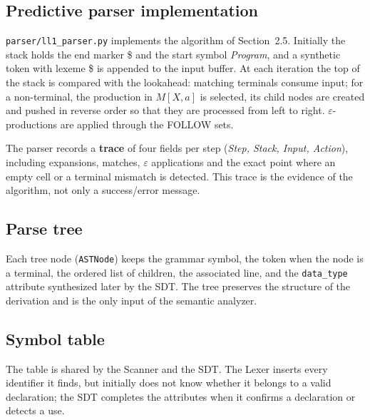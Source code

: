 \documentclass[11pt,a4paper]{article}
\newcommand{\eps}{\varepsilon}
\newcommand{\nt}[1]{\textit{#1}}
\begin{document}
\subsection{Predictive parser implementation}
\texttt{parser/ll1\_parser.py} implements the algorithm of Section~2.5. Initially the stack holds the end marker \$ and the start symbol \nt{Program}, and a synthetic token with lexeme \$ is appended to the input buffer. At each iteration the top of the stack is compared with the lookahead: matching terminals consume input; for a non-terminal, the production in $M[X,a]$ is selected, its child nodes are created and pushed in reverse order so that they are processed from left to right. $\eps$-productions are applied through the FOLLOW sets.

The parser records a \textbf{trace} of four fields per step (\emph{Step, Stack, Input, Action}), including expansions, matches, $\eps$ applications and the exact point where an empty cell or a terminal mismatch is detected. This trace is the evidence of the algorithm, not only a success/error message.

\subsection{Parse tree}
Each tree node (\texttt{ASTNode}) keeps the grammar symbol, the token when the node is a terminal, the ordered list of children, the associated line, and the \texttt{data\_type} attribute synthesized later by the SDT. The tree preserves the structure of the derivation and is the only input of the semantic analyzer.

\subsection{Symbol table}
The table is shared by the Scanner and the SDT. The Lexer inserts every identifier it finds, but initially does not know whether it belongs to a valid declaration; the SDT completes the attributes when it confirms a declaration or detects a use.
\end{document}
